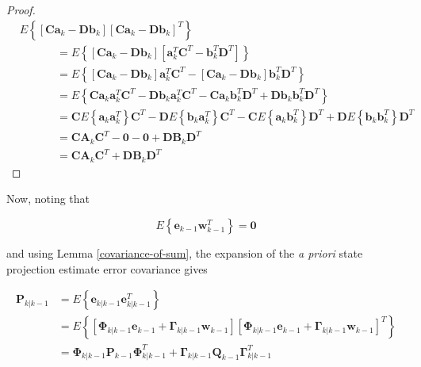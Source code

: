 \begin{proof}
\begin{equation*}
    \begin{aligned}
        &E \left\{ \left[ \mathbf{C} \mathbf{a}_k - \mathbf{D} \mathbf{b}_k \right] \left[ \mathbf{C} \mathbf{a}_k - \mathbf{D} \mathbf{b}_k \right]^T \right\} \\
        & \phantom{XXXX} = E \left\{ \left[ \mathbf{C} \mathbf{a}_k - \mathbf{D} \mathbf{b}_k \right] \left[ \mathbf{a}_k^T \mathbf{C}^T - \mathbf{b}_k^T \mathbf{D}^T \right] \right\} \\
        & \phantom{XXXX} = E \left\{ \left[ \mathbf{C} \mathbf{a}_k - \mathbf{D} \mathbf{b}_k \right] \mathbf{a}_k^T \mathbf{C}^T
        - \left[ \mathbf{C} \mathbf{a}_k - \mathbf{D} \mathbf{b}_k \right] \mathbf{b}_k^T \mathbf{D}^T \right\} \\
        & \phantom{XXXX} = E \left\{ \mathbf{C} \mathbf{a}_k \mathbf{a}_k^T \mathbf{C}^T - \mathbf{D} \mathbf{b}_k \mathbf{a}_k^T \mathbf{C}^T
        - \mathbf{C} \mathbf{a}_k \mathbf{b}_k^T \mathbf{D}^T + \mathbf{D} \mathbf{b}_k \mathbf{b}_k^T \mathbf{D}^T \right\} \\
        & \phantom{XXXX} = \mathbf{C} E \left\{ \mathbf{a}_k \mathbf{a}_k^T \right\} \mathbf{C}^T - \mathbf{D} E \left\{ \mathbf{b}_k \mathbf{a}_k^T \right\} \mathbf{C}^T
        - \mathbf{C} E \left\{ \mathbf{a}_k \mathbf{b}_k^T \right\} \mathbf{D}^T + \mathbf{D} E \left\{ \mathbf{b}_k \mathbf{b}_k^T \right\} \mathbf{D}^T \\
        & \phantom{XXXX} = \mathbf{C} \mathbf{A}_k \mathbf{C}^T - \mathbf{0} - \mathbf{0} + \mathbf{D} \mathbf{B}_k \mathbf{D}^T \\
        & \phantom{XXXX} = \mathbf{C} \mathbf{A}_k \mathbf{C}^T + \mathbf{D} \mathbf{B}_k \mathbf{D}^T
    \end{aligned}
\end{equation*}
\end{proof}

Now, noting that

\begin{equation*}
    E \left\{ \mathbf{e}_{k-1} \mathbf{w}_{k-1}^T \right\} = \mathbf{0}
\end{equation*}

and using Lemma \ref{covariance-of-sum}, the expansion of the \textit{a priori} state
projection estimate error covariance gives

\begin{equation*}
    \begin{aligned}
        \mathbf{P}_{k|k-1} &= E \left\{ \mathbf{e}_{k|k-1} \mathbf{e}_{k|k-1}^T \right\} \\
        &= E \left\{ \left[ \mathbf{\Phi}_{k|k-1} \mathbf{e}_{k-1} + \mathbf{\Gamma}_{k|k-1} \mathbf{w}_{k-1} \right]
        \left[ \mathbf{\Phi}_{k|k-1} \mathbf{e}_{k-1} + \mathbf{\Gamma}_{k|k-1} \mathbf{w}_{k-1} \right]^T \right\} \\
        &= \mathbf{\Phi}_{k|k-1} \mathbf{P}_{k-1} \mathbf{\Phi}_{k|k-1}^T + \mathbf{\Gamma}_{k|k-1} \mathbf{Q}_{k-1} \mathbf{\Gamma}_{k|k-1}^T
    \end{aligned}
\end{equation*}

